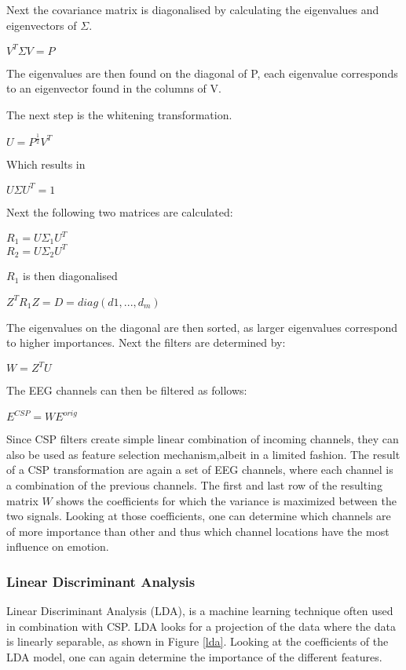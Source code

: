 \npar

Next the covariance matrix is diagonalised by calculating the eigenvalues and eigenvectors of $\Sigma$.
\begin{center}
$V^T\Sigma V = P$
\end{center}
The eigenvalues are then found on the diagonal of P, each eigenvalue corresponds to an eigenvector found in the columns of V.

\npar

The next step is the whitening transformation.
\begin{center}
$U = P^{\frac{1}{2}}V^T$ \\
\end{center}
Which results in
\begin{center}
$U\Sigma U^T = 1$
\end{center}
Next the following two matrices are calculated:
\begin{center}
$R_1 = U\Sigma_1U^T$\\
$R_2 = U\Sigma_2U^T$
\end{center}
$R_1$ is then diagonalised
\begin{center}
$Z^TR_1Z = D = diag(d1, ..., d_m)$
\end{center}
The eigenvalues on the diagonal are then sorted, as larger eigenvalues correspond to higher importances. %
Next the filters are determined by:
\begin{center}
$W = Z^TU$
\end{center}
The EEG channels can then be filtered as follows:
\begin{center}
$E^{CSP} = WE^{orig}$
\end{center}

\npar

Since CSP filters create simple linear combination of incoming channels, they can also be used as feature selection mechanism,albeit in a limited fashion. The result of a CSP transformation are again a set of EEG channels, where each channel is a combination of the previous channels. The first and last row of the resulting matrix $W$ shows the coefficients for which the variance is maximized between the two signals. Looking at those coefficients, one can determine which channels are of more importance than other and thus which channel locations have the most influence on emotion.

\subsubsection{Linear Discriminant Analysis}
Linear Discriminant Analysis (LDA), is a machine learning technique often used in combination with CSP\cite{ErrorPotentials,svmldacomp,currTrends}. LDA looks for a projection of the data where the data is linearly separable, as shown in Figure \ref{lda}. Looking at the coefficients of the LDA model, one can again determine the importance of the different features.

